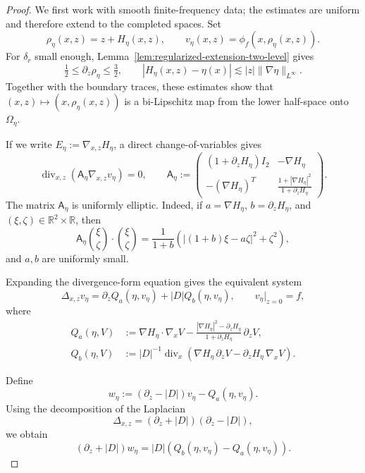 \documentclass[10pt,a4paper]{amsart}
\newcommand{\R}{\mathbb{R}}
\begin{document}
\begin{proof}
We first work with smooth finite-frequency data; the estimates are uniform
and therefore extend to the completed spaces. Set
\[
 \rho_\eta(x,z)=z+H_\eta(x,z),
 \qquad v_\eta(x,z)=\phi_f(x,\rho_\eta(x,z)).
\]
For \(\delta_r\) small enough, Lemma~\ref{lem:regularized-extension-two-level} gives
\[
\tfrac12\leq\partial_z\rho_\eta\leq\tfrac32, \qquad |H_\eta(x,z)-\eta(x)|
 \lesssim |z|\|\nabla\eta\|_{L^\infty}.
\]
Together with the boundary traces, these estimates show that \((x,z)\mapsto(x,\rho_\eta(x,z))\) is a bi-Lipschitz map from the lower
half-space onto \(\Omega_\eta\).

If we write \(E_\eta:=\nabla_{x,z}H_\eta\), a direct change-of-variables gives
\begin{equation*}
 \operatorname{div}_{x,z} \left( \mathsf A_\eta\nabla_{x,z}v_\eta \right)=0, \qquad
 \mathsf A_\eta  :=
 \begin{pmatrix}
 (1+\partial_zH_\eta)I_2 & -\nabla H_\eta\\[2mm]
 -(\nabla H_\eta)^T & \displaystyle \frac{1+|\nabla H_\eta|^2} {1+\partial_zH_\eta}
 \end{pmatrix}.
\end{equation*}
The matrix \(\mathsf A_\eta\) is uniformly elliptic.
Indeed, if \(a=\nabla H_\eta\), \(b=\partial_zH_\eta\), and \((\xi,\zeta)\in\R^2\times\R\), then
\[
 \mathsf A_\eta \binom{\xi}{\zeta} \cdot \binom{\xi}{\zeta} = \frac1{1+b} \left( |(1+b)\xi-a\zeta|^2+\zeta^2 \right),
\]
and \(a,b\) are uniformly small.

Expanding the divergence-form equation gives the equivalent system
\begin{equation*}
 \Delta_{x,z}v_\eta = \partial_zQ_a(\eta,v_\eta) + |D|Q_b(\eta,v_\eta), \qquad v_\eta|_{z=0}=f,
\end{equation*}
where
\begin{align*}
 Q_a(\eta,V) &:= \nabla H_\eta\cdot\nabla_xV
 -\frac{|\nabla H_\eta|^2-\partial_zH_\eta}
 {1+\partial_zH_\eta}\,\partial_zV,\\
 Q_b(\eta,V) &:= |D|^{-1}\operatorname{div}_x
 \left(  \nabla H_\eta\,\partial_zV
  -\partial_zH_\eta\,\nabla_xV \right).
\end{align*}

Define
\[
 w_\eta := (\partial_z-|D|)v_\eta - Q_a(\eta,v_\eta).
\]
Using the decomposition of the Laplacian
\[
 \Delta_{x,z} = (\partial_z+|D|)(\partial_z-|D|),
\]
we obtain
\begin{equation*}
 (\partial_z+|D|)w_\eta = |D| \left( Q_b(\eta,v_\eta)-Q_a(\eta,v_\eta) \right).
\end{equation*}


\end{proof}
\end{document}
